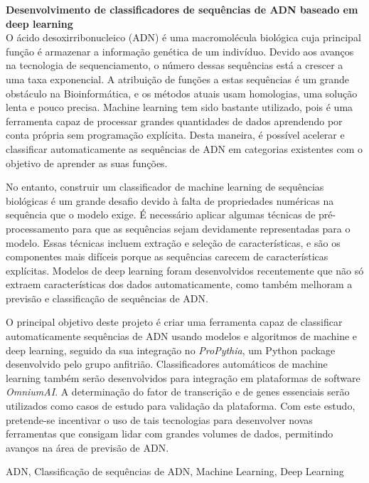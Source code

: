 {\large \textbf{Desenvolvimento de classificadores de sequências de ADN baseado em deep learning}}\\[1ex]
\noindent O ácido desoxirribonucleico (ADN) é uma macromolécula biológica cuja principal função é armazenar a informação genética de um indivíduo. Devido aos avanços na tecnologia de sequenciamento, o número dessas sequências está a crescer a uma taxa exponencial. A atribuição de funções a estas sequências é um grande obstáculo na Bioinformática, e os métodos atuais usam homologias, uma solução lenta e pouco precisa. Machine learning tem sido bastante utilizado, pois é uma ferramenta capaz de processar grandes quantidades de dados aprendendo por conta própria sem programação explícita. Desta maneira, é possível acelerar e classificar automaticamente as sequências de ADN em categorias existentes com o objetivo de aprender as suas funções.

No entanto, construir um classificador de machine learning de sequências biológicas é um grande desafio devido à falta de propriedades numéricas na sequência que o modelo exige. É necessário aplicar algumas técnicas de pré-processamento para que as sequências sejam devidamente representadas para o modelo. Essas técnicas incluem extração e seleção de características, e são os componentes mais difíceis porque as sequências carecem de características explícitas. Modelos de deep learning foram desenvolvidos recentemente que não só extraem características dos dados automaticamente, como também melhoram a previsão e classificação de sequências de ADN.

O principal objetivo deste projeto é criar uma ferramenta capaz de classificar automaticamente sequências de ADN usando modelos e algoritmos de machine e deep learning, seguido da sua integração no \textit{ProPythia}, um Python package desenvolvido pelo grupo anfitrião. Classificadores automáticos de machine learning também serão desenvolvidos para integração em plataformas de software \textit{OmniumAI}. A determinação do fator de transcrição e de genes essenciais serão utilizados como casos de estudo para validação da plataforma. Com este estudo, pretende-se incentivar o uso de tais tecnologias para desenvolver novas ferramentas que consigam lidar com grandes volumes de dados, permitindo avanços na área de previsão de ADN.

\begin{keywords}
ADN, Classificação de sequências de ADN, Machine Learning, Deep Learning
\end{keywords}
